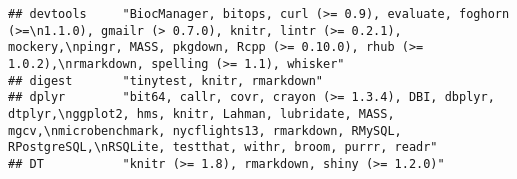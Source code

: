 \documentclass[]{book}
\begin{document}
\begin{verbatim}
## devtools     "BiocManager, bitops, curl (>= 0.9), evaluate, foghorn (>=\n1.1.0), gmailr (> 0.7.0), knitr, lintr (>= 0.2.1), mockery,\npingr, MASS, pkgdown, Rcpp (>= 0.10.0), rhub (>= 1.0.2),\nrmarkdown, spelling (>= 1.1), whisker"                                                                                                                                                                                                                                                                                                                                                                                                                                                                                 
## digest       "tinytest, knitr, rmarkdown"                                                                                                                                                                                                                                                                                                                                                                                                                                                                                                                                                                                                                                                                              
## dplyr        "bit64, callr, covr, crayon (>= 1.3.4), DBI, dbplyr, dtplyr,\nggplot2, hms, knitr, Lahman, lubridate, MASS, mgcv,\nmicrobenchmark, nycflights13, rmarkdown, RMySQL, RPostgreSQL,\nRSQLite, testthat, withr, broom, purrr, readr"                                                                                                                                                                                                                                                                                                                                                                                                                                                                          
## DT           "knitr (>= 1.8), rmarkdown, shiny (>= 1.2.0)"                                                                                                                                                                                                                                                                                                                                                                                                                                                                                                                                                                                                                                                             

\end{verbatim}
\end{document}

